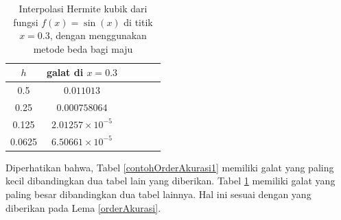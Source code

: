 \begin{contoh}
\begin{table}[htp]
        \centering
        \begin{tabular}{|c|c|c|c|c|c|}
    \hline $h$& galat di $x = 0.3$  \\ 
    \hline
0.5&$0.011013$  \\
0.25&$0.000758064 $ \\
0.125&$2.01257 \times 10^{-5}$  \\
0.0625&$6.50661 \times 10^{-5}$  \\
    \hline
    \end{tabular}
        \caption{Interpolasi Hermite kubik dari fungsi $f(x)=\sin(x)$ di titik $x=0.3$, dengan menggunakan metode beda bagi maju}
        \label{contohOrderAkurasi3}
\end{table}
Diperhatikan bahwa, Tabel \ref{contohOrderAkurasi1} memiliki galat yang paling kecil dibandingkan dua tabel lain yang diberikan. Tabel \ref{contohOrderAkurasi3} memiliki galat yang paling besar dibandingkan dua tabel lainnya. Hal ini sesuai dengan yang diberikan pada Lema \ref{orderAkurasi}.
\end{contoh}

